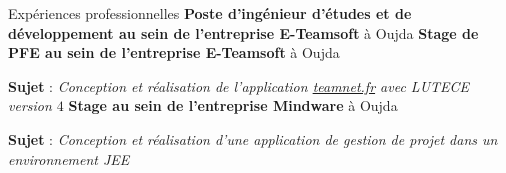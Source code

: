\begin{rubric}{Expériences professionnelles}
%
%
	\textbf{Poste d'ingénieur d'études et de développement au sein de l’entreprise E-Teamsoft} à Oujda
%
%
	\textbf{Stage de PFE au sein de l’entreprise E-Teamsoft} à Oujda
	\par \textbf{Sujet} : \emph{Conception et réalisation de l'application \url{teamnet.fr} avec LUTECE version $4$}
%
%
	\textbf{Stage au sein de l’entreprise Mindware} à Oujda
	\par \textbf{Sujet} : \emph{Conception et réalisation d'une application de gestion de projet dans un environnement JEE}
%
%
\end{rubric}
